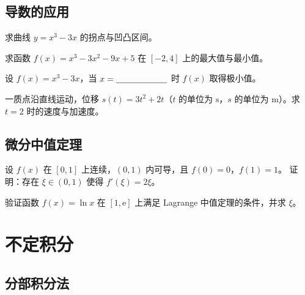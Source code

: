 \documentclass[answersection,pad]{kiritex}
\begin{document}
\subsection{导数的应用}

\begin{problem}
  求曲线 $y=x^3-3x$ 的拐点与凹凸区间。
\end{problem}

\begin{problem}
  求函数 $f(x)=x^3-3x^2-9x+5$ 在 $[-2,4]$ 上的最大值与最小值。
\end{problem}

\begin{problem}
  设 $f(x)=x^{3}-3x$，当 $x=\problemblock$ 时 $f(x)$ 取得极小值。
\end{problem}

\begin{problem}
  一质点沿直线运动，位移 $s(t)=3t^{2}+2t$（$t$ 的单位为 $\mathrm{s}$，$s$ 的单位为 $\mathrm{m}$）。求 $t=2$ 时的速度与加速度。
\end{problem}

\subsection{微分中值定理}

\begin{problem}
  设 $f(x)$ 在 $[0,1]$ 上连续，$(0,1)$ 内可导，且 $f(0)=0$，$f(1)=1$。
  证明：存在 $\xi\in(0,1)$ 使得 $f'(\xi)=2\xi$。
\end{problem}

\begin{problem}
  验证函数 $f(x)=\ln x$ 在 $[1,\mathrm{e}]$ 上满足 Lagrange 中值定理的条件，并求 $\xi$。
\end{problem}

\section{不定积分}

\subsection{分部积分法}
\end{document}
